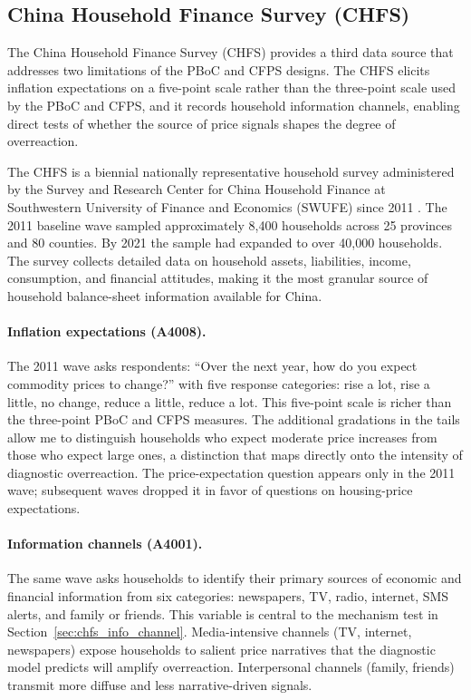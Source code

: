 \subsection{China Household Finance Survey (CHFS)}%

The China Household Finance Survey (CHFS) provides a third data source
that addresses two limitations of the PBoC and CFPS designs. The CHFS
elicits inflation expectations on a five-point scale rather than the
three-point scale used by the PBoC and CFPS, and it records household
information channels, enabling direct tests of whether the source of
price signals shapes the degree of overreaction.

The CHFS is a biennial nationally representative household survey
administered by the Survey and Research Center for China Household
Finance at Southwestern University of Finance and Economics (SWUFE)
since 2011 \citep{Gan2014}. The 2011 baseline wave sampled
approximately 8,400 households across 25 provinces and 80 counties. By
2021 the sample had expanded to over 40,000 households. The survey
collects detailed data on household assets, liabilities, income,
consumption, and financial attitudes, making it the most granular
source of household balance-sheet information available for China.

\paragraph{Inflation expectations (A4008).}
The 2011 wave asks respondents: ``Over the next year, how do you expect
commodity prices to change?'' with five response categories: rise a
lot, rise a little, no change, reduce a little, reduce a lot. This
five-point scale is richer than the three-point PBoC and CFPS measures.
The additional gradations in the tails allow me to distinguish
households who expect moderate price increases from those who expect
large ones, a distinction that maps directly onto the intensity of
diagnostic overreaction. The price-expectation question appears only in
the 2011 wave; subsequent waves dropped it in favor of questions on
housing-price expectations.

\paragraph{Information channels (A4001).}
The same wave asks households to identify their primary sources of
economic and financial information from six categories: newspapers, TV,
radio, internet, SMS alerts, and family or friends. This variable is
central to the mechanism test in Section~\ref{sec:chfs_info_channel}.
Media-intensive channels (TV, internet, newspapers) expose households
to salient price narratives that the diagnostic model predicts will
amplify overreaction. Interpersonal channels (family, friends) transmit
more diffuse and less narrative-driven signals.

